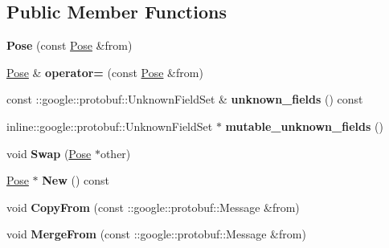 \subsection*{Public Member Functions}
\begin{DoxyCompactItemize}
\item 
{\bfseries Pose} (const \hyperlink{classvss__state_1_1Pose}{Pose} \&from)\hypertarget{classvss__state_1_1Pose_afbd08781a545cc0d5b06623f929e80c7}{}\label{classvss__state_1_1Pose_afbd08781a545cc0d5b06623f929e80c7}

\item 
\hyperlink{classvss__state_1_1Pose}{Pose} \& {\bfseries operator=} (const \hyperlink{classvss__state_1_1Pose}{Pose} \&from)\hypertarget{classvss__state_1_1Pose_af5acd047e2b69e6fbb54592bbf599bfc}{}\label{classvss__state_1_1Pose_af5acd047e2b69e6fbb54592bbf599bfc}

\item 
const \+::google\+::protobuf\+::\+Unknown\+Field\+Set \& {\bfseries unknown\+\_\+fields} () const \hypertarget{classvss__state_1_1Pose_a6c3b4c8e189c186061297043d00b68bb}{}\label{classvss__state_1_1Pose_a6c3b4c8e189c186061297043d00b68bb}

\item 
inline\+::google\+::protobuf\+::\+Unknown\+Field\+Set $\ast$ {\bfseries mutable\+\_\+unknown\+\_\+fields} ()\hypertarget{classvss__state_1_1Pose_a76aee4c2024d80ffe335e65907434dee}{}\label{classvss__state_1_1Pose_a76aee4c2024d80ffe335e65907434dee}

\item 
void {\bfseries Swap} (\hyperlink{classvss__state_1_1Pose}{Pose} $\ast$other)\hypertarget{classvss__state_1_1Pose_a6288b4add8dde23e78f2dd0a54ddc00a}{}\label{classvss__state_1_1Pose_a6288b4add8dde23e78f2dd0a54ddc00a}

\item 
\hyperlink{classvss__state_1_1Pose}{Pose} $\ast$ {\bfseries New} () const \hypertarget{classvss__state_1_1Pose_a3e223c73402678963630ee5991e2df40}{}\label{classvss__state_1_1Pose_a3e223c73402678963630ee5991e2df40}

\item 
void {\bfseries Copy\+From} (const \+::google\+::protobuf\+::\+Message \&from)\hypertarget{classvss__state_1_1Pose_a6e17322c8f9d53e131ed8e1702aefcd3}{}\label{classvss__state_1_1Pose_a6e17322c8f9d53e131ed8e1702aefcd3}

\item 
void {\bfseries Merge\+From} (const \+::google\+::protobuf\+::\+Message \&from)\hypertarget{classvss__state_1_1Pose_aa1e7e92d17b26dce271b698e86145d2b}{}\label{classvss__state_1_1Pose_aa1e7e92d17b26dce271b698e86145d2b}


\end{DoxyCompactItemize}
